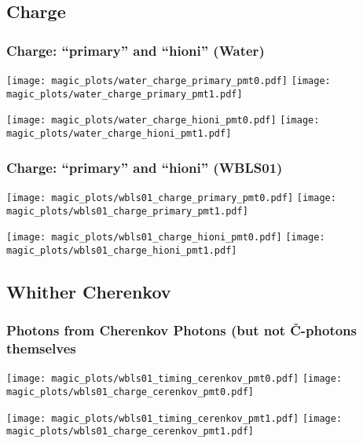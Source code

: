 \documentclass[xcolor=dvipsnames]{beamer}
\begin{document}
\subsection{Charge}

\begin{frame}[fragile]
  \frametitle{Charge: ``primary'' and ``hioni'' (Water)}

\texttt{[image: magic\_plots/water\_charge\_primary\_pmt0.pdf]}%
\texttt{[image: magic\_plots/water\_charge\_primary\_pmt1.pdf]}%

\texttt{[image: magic\_plots/water\_charge\_hioni\_pmt0.pdf]}%
\texttt{[image: magic\_plots/water\_charge\_hioni\_pmt1.pdf]}%
\end{frame}

\begin{frame}[fragile]
  \frametitle{Charge: ``primary'' and ``hioni'' (WBLS01)}

\texttt{[image: magic\_plots/wbls01\_charge\_primary\_pmt0.pdf]}%
\texttt{[image: magic\_plots/wbls01\_charge\_primary\_pmt1.pdf]}%

\texttt{[image: magic\_plots/wbls01\_charge\_hioni\_pmt0.pdf]}%
\texttt{[image: magic\_plots/wbls01\_charge\_hioni\_pmt1.pdf]}%
\end{frame}

\subsection {Whither Cherenkov}

\begin{frame}[fragile]
  \frametitle{Photons from Cherenkov Photons (but not \v{C}-photons themselves}

\texttt{[image: magic\_plots/wbls01\_timing\_cerenkov\_pmt0.pdf]}%
\texttt{[image: magic\_plots/wbls01\_charge\_cerenkov\_pmt0.pdf]}%

\texttt{[image: magic\_plots/wbls01\_timing\_cerenkov\_pmt1.pdf]}%
\texttt{[image: magic\_plots/wbls01\_charge\_cerenkov\_pmt1.pdf]}%

\end{frame}
\end{document}
